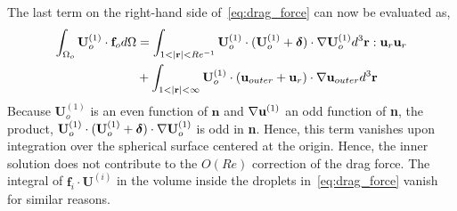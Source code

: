 The last term on the right-hand side of~\ref{eq:drag_force} can now be evaluated as,  
\begin{align}
    \intO[o]{\textbf{U}_{o}^{(1)}\cdot \textbf{f}_{o}}
    &=
    \int_{1<|\textbf{r}|<Re^{-1}}{
    \textbf{U}_{o}^{(1)}\cdot 
    (\textbf{U}_{o}^{(1)} + \bm\delta)\cdot \grad \textbf{U}_{o}^{(1)}
    }d^3\textbf{r}: \textbf{u}_r\textbf{u}_r\\
    &+ 
    \int_{1<|\textbf{r}|<\infty}{
    \textbf{U}_{o}^{(1)}\cdot 
    (\textbf{u}_{outer} + \textbf{u}_r)\cdot \grad \textbf{u}_{outer}
    }d^3\textbf{r} 
    \label{eq:inertial_term}
\end{align}
Because $\textbf{U}_o^{(1)}$ is an even function of $\textbf{n}$ and $\mathbf{\nabla} \textbf{u}^{(1)}$ an odd function of \textbf{n}, the product,  
$\textbf{U}_{o}^{(1)}\cdot 
(\textbf{U}_{o}^{(1)} + \bm\delta)\cdot \mathbf{\nabla} \textbf{U}_{o}^{(1)}$ is odd in \textbf{n}. 
Hence, this term vanishes upon integration over the spherical surface centered at the origin. 
Hence, the inner solution does not contribute to the $O(Re)$ correction of the drag force. 
The integral of $\textbf{f}_i \cdot \textbf{U}^{(i)}$ in the volume inside the droplets in~\ref{eq:drag_force} vanish for similar reasons. 

